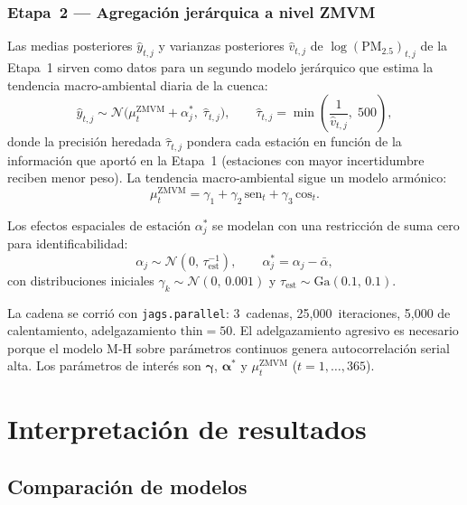 ﻿\documentclass[12pt]{article}
\begin{document}
\subsubsection*{Etapa~2 --- Agregaci\'on jer\'arquica a nivel ZMVM}

Las medias posteriores $\hat{y}_{t,j}$ y varianzas posteriores
$\hat{v}_{t,j}$ de $\log(\text{PM}_{2.5})_{t,j}$ de la Etapa~1
sirven como datos para un segundo modelo jer\'arquico que estima la
tendencia macro-ambiental diaria de la cuenca:
\[
  \hat{y}_{t,j} \sim \mathcal{N}\!\bigl(\mu^\text{ZMVM}_t + \alpha^\ast_j,\;
  \hat\tau_{t,j}\bigr), \qquad
  \hat\tau_{t,j} = \min\!\left(\frac{1}{\hat{v}_{t,j}},\; 500\right),
\]
donde la precisi\'on heredada $\hat\tau_{t,j}$ pondera cada estaci\'on
en funci\'on de la informaci\'on que aport\'o en la Etapa~1 (estaciones
con mayor incertidumbre reciben menor peso).
La tendencia macro-ambiental sigue un modelo arm\'onico:
\[
  \mu^\text{ZMVM}_t = \gamma_1 + \gamma_2\,\text{sen}_t + \gamma_3\,\text{cos}_t.
\]

Los efectos espaciales de estaci\'on $\alpha^\ast_j$ se modelan con una
restricci\'on de suma cero para identificabilidad:
\[
  \alpha_j \sim \mathcal{N}(0,\,\tau_\text{est}^{-1}), \qquad
  \alpha^\ast_j = \alpha_j - \bar\alpha,
\]
con distribuciones iniciales $\gamma_k \sim \mathcal{N}(0,\,0.001)$
y $\tau_\text{est} \sim \text{Ga}(0.1,\,0.1)$.

La cadena se corri\'o con \texttt{jags.parallel}: 3~cadenas,
25{,}000~iteraciones, 5{,}000 de calentamiento, adelgazamiento $\text{thin}=50$.
El adelgazamiento agresivo es necesario porque el modelo M-H sobre
par\'ametros continuos genera autocorrelaci\'on serial alta.
Los par\'ametros de inter\'es son $\boldsymbol\gamma$,
$\boldsymbol\alpha^\ast$ y $\mu^\text{ZMVM}_t$ ($t = 1,\ldots,365$).


\section{Interpretaci\'on de resultados}

\subsection{Comparaci\'on de modelos}
\end{document}
